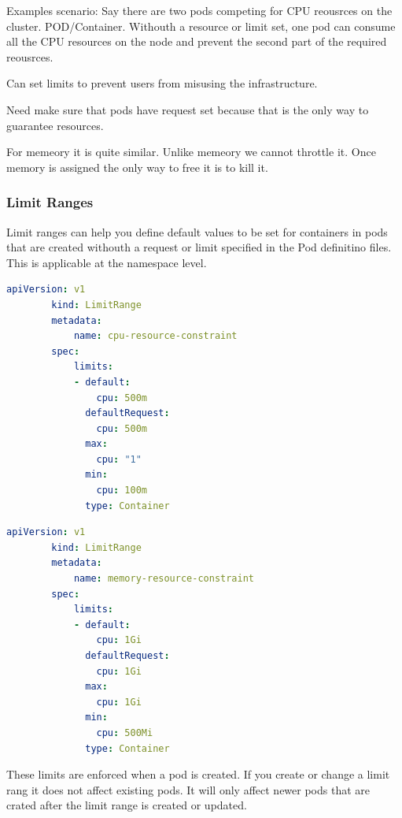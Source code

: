 \documentclass[11pt]{book}
\begin{document}
    Examples scenario: %
    Say there are two pods competing for CPU reousrces on the cluster. POD/Container.
    Withouth a resource or limit set, one pod can consume all the CPU resources on the node and prevent the second part of the required reousrces.

    Can set limits to prevent users from misusing the infrastructure.

    Need make sure that pods have request set because that is the only way to guarantee resources.

    For memeory it is quite similar. %
    Unlike memeory we cannot throttle it. Once memory is assigned the only way to free it is to kill it.

    \subsubsection{Limit Ranges}
    Limit ranges can help you define default values to be set for containers in pods that are created withouth a request or limit specified in the Pod definitino files.
    This is applicable at the namespace level.

    \begin{lstlisting}[language=yaml, caption={Limit range example}]
        apiVersion: v1
        kind: LimitRange
        metadata:
            name: cpu-resource-constraint
        spec:
            limits:
            - default:
                cpu: 500m
              defaultRequest:
                cpu: 500m
              max:
                cpu: "1"
              min:
                cpu: 100m
              type: Container
    \end{lstlisting}

    \begin{lstlisting}[language=yaml, caption={Limit range example}]
        apiVersion: v1
        kind: LimitRange
        metadata:
            name: memory-resource-constraint
        spec:
            limits:
            - default:
                cpu: 1Gi
              defaultRequest:
                cpu: 1Gi
              max:
                cpu: 1Gi
              min:
                cpu: 500Mi
              type: Container
    \end{lstlisting}

    These limits are enforced when a pod is created.
    If you create or change a limit rang it does not affect existing pods.
    It will only affect newer pods that are crated after the limit range is created or updated.
\end{document}

